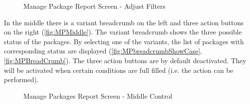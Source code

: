 \begin{figure}[htb]
		\centering
	\vspace{5pt}
 
    \caption{Manage Package Report Screen - Adjust Filters}
    \label{fig:MPAjustFilters}
\end{figure}

In the middle there is a variant breadcrumb on the left and three action buttons on the right (\autoref{fig:MPMiddle}). The variant breadcrumb shows the three possible status of the packages. By selecting one of the variants, the list of packages with corresponding status are displayed (\autoref{fig:MPbreadcrumbShowCase}, \autoref{fig:MPBreadCrumb}). The three action buttons are by default deactivated. They will be activated when certain conditions are full filled (i.e. the action can be performed).

\begin{figure}[H]
	\centering
	\hspace{5pt}
  \caption{Manage Packages Report Screen - Middle Control}
	\label{fig:MPMiddle}
\end{figure}

